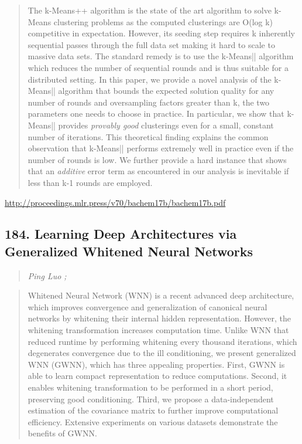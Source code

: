 \documentclass{article}
\begin{document}
\begin{quote}
    The k-Means++ algorithm is the state of the art algorithm to solve k-Means clustering problems as the computed clusterings are O(log k) competitive in expectation. However, its seeding step requires k inherently sequential passes through the full data set making it hard to scale to massive data sets. The standard remedy is to use the k-Means|| algorithm which reduces the number of sequential rounds and is thus suitable for a distributed setting. In this paper, we provide a novel analysis of the k-Means|| algorithm that bounds the expected solution quality for any number of rounds and oversampling factors greater than k, the two parameters one needs to choose in practice. In particular, we show that k-Means|| provides \textit{provably good} clusterings even for a small, constant number of iterations. This theoretical finding explains the common observation that k-Means|| performs extremely well in practice even if the number of rounds is low. We further provide a hard instance that shows that an \textit{additive} error term as encountered in our analysis is inevitable if less than k-1 rounds are employed.  
\end{quote}

\href{http://proceedings.mlr.press/v70/bachem17b/bachem17b.pdf}{http://proceedings.mlr.press/v70/bachem17b/bachem17b.pdf}

\subsection{184. Learning Deep Architectures via Generalized Whitened Neural Networks}

\begin{quote}
\footnotesize{\textit{Ping Luo ;}}

\end{quote}

\begin{quote}
    Whitened Neural Network (WNN) is a recent advanced deep architecture, which improves convergence and generalization of canonical neural networks by whitening their internal hidden representation. However, the whitening transformation increases computation time. Unlike WNN that reduced runtime by performing whitening every thousand iterations, which degenerates convergence due to the ill conditioning, we present generalized WNN (GWNN), which has three appealing properties. First, GWNN is able to learn compact representation to reduce computations. Second, it enables whitening transformation to be performed in a short period, preserving good conditioning. Third, we propose a data-independent estimation of the covariance matrix to further improve computational efficiency. Extensive experiments on various datasets demonstrate the benefits of GWNN.  
\end{quote}
\end{document}
